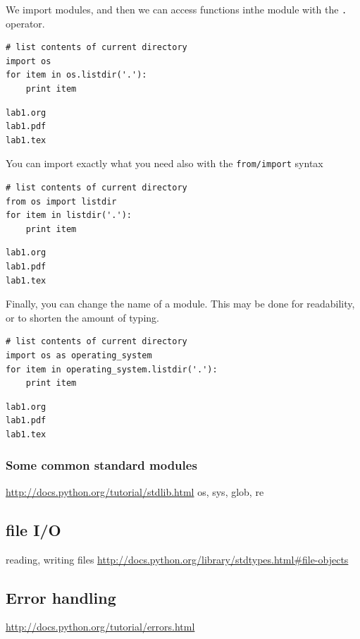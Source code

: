 \documentclass[11pt]{article}
\begin{document}
We import modules, and then we can access functions inthe module with the \texttt{.} operator.

\begin{verbatim}
# list contents of current directory
import os
for item in os.listdir('.'):
    print item
\end{verbatim}

\begin{verbatim}
lab1.org
lab1.pdf
lab1.tex
\end{verbatim}

You can import exactly what you need also with the \texttt{from/import} syntax
\begin{verbatim}
# list contents of current directory
from os import listdir
for item in listdir('.'):
    print item
\end{verbatim}

\begin{verbatim}
lab1.org
lab1.pdf
lab1.tex
\end{verbatim}

Finally, you can change the name of a module. This may be done for readability, or to shorten the amount of typing.
\begin{verbatim}
# list contents of current directory
import os as operating_system
for item in operating_system.listdir('.'):
    print item
\end{verbatim}

\begin{verbatim}
lab1.org
lab1.pdf
lab1.tex
\end{verbatim}

\subsubsection{Some common standard modules}
\label{sec-3-8-1}
\url{http://docs.python.org/tutorial/stdlib.html}
os, sys, glob,  re


\subsection{file I/O}
\label{sec-3-9}
reading, writing files
\url{http://docs.python.org/library/stdtypes.html#file-objects}


\subsection{Error handling}
\label{sec-3-10}
\url{http://docs.python.org/tutorial/errors.html}
\end{document}
